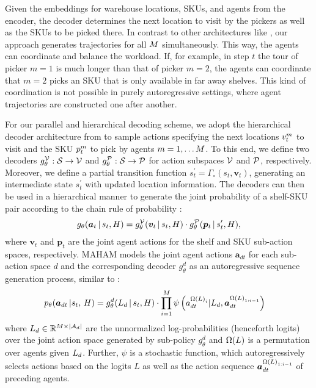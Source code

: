 


Given the embeddings for warehouse locations, SKUs, and agents from the encoder, the decoder determines the next location to visit by the pickers as well as the SKUs to be picked there. In contrast to other architectures like \cite{son2024equity}, our approach generates trajectories for all ${M}$ simultaneously. This way, the agents can coordinate and balance the workload. If, for example, in step $t$ the tour of picker $m=1$ is much longer than that of picker $m=2$, the agents can coordinate that $m=2$ picks an SKU that is only available in far away shelves. This kind of coordination is not possible in purely autoregressive settings, where agent trajectories are constructed one after another. 

For our parallel and hierarchical decoding scheme, we adopt the hierarchical decoder architecture from \cite{luttmann2024neural} to sample actions specifying the next locations $v^{{m}}_{t}$ to visit and the SKU $p^{{m}}_{t}$  to pick by agents ${m}=1,\ldots {M}$. To this end, we define two decoders $g^{\mathcal{V}}_{\theta}: \mathcal{S} \rightarrow \mathcal{V}$ and $g^{\mathcal{P}}_{\theta}: \mathcal{S} \rightarrow \mathcal{P}$ for action subspaces $\mathcal{V}$ and $\mathcal{P}$, respectively. Moreover, we define a partial transition function $s_t^\prime = \Gamma_\circ(s_t, \bm{v}_t)$, generating an intermediate state $s_t^\prime$ with updated location information. The decoders can then be used in a hierarchical manner to generate the joint probability of a shelf-SKU pair according to the chain rule of probability \cite{luttmann2024neural}:
%
\begin{align}
    \label{eq:multi-agent-policy}
    g_\theta (\bm{a}_t \, | \, s_t, H) = g^{\mathcal{V}}_{\theta} (\bm{v}_t \, | \,  s_t, H) \cdot g^{\mathcal{P}}_{\theta} (\bm{p}_t \, | \, s_t^\prime, H),
\end{align}
%
where $\bm{v}_t$ and $\bm{p}_t$ are the joint agent actions for the shelf and SKU sub-action spaces, respectively. MAHAM models the joint agent actions $\bm{a}_{dt}$ for each sub-action space $d$ and the corresponding decoder $g_\theta^d$ as an autoregressive sequence generation process, similar to :
%
\begin{align}
\label{eq:maham}
p_\theta(\bm{a}_{dt} \, | s_t, \, H) &= g^d_\theta(L_d \, | \, s_t, H) \cdot \prod_{i=1}^{M} \psi \left( a^{{\Omega(L)}_{i}}_{dt} | L_d, \bm{a}^{{\Omega(L)}_{1:i-1}}_{dt} \right)
\end{align}
%
where $L_d \in \mathbb{R}^{{M} \times |\mathcal{A}_d|}$ are the unnormalized log-probabilities (henceforth logits) over the joint action space generated by sub-policy $g_\theta^d$ and ${\Omega(L)}$ is a permutation over agents given $L_d$. Further, $\psi$ is a stochastic function, which autoregressively selects actions based on the logits $L$ as well as the action sequence $\bm{a}^{{\Omega(L)}_{1:i-1}}_{dt}$ of preceding agents.
